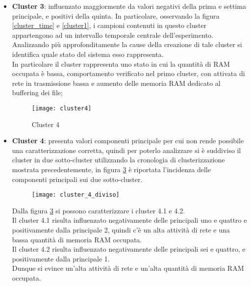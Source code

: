 \begin{itemize}
  \clearpage

  \begin{figure}[!htbp]
    \centering
    \texttt{[image: cluster3]}
    \caption{Cluster 3}
    \label{cluster3}
  \end{figure}

  \item \textbf{Cluster 3}: influenzato maggiormente da valori negativi della
  prima e settima principale, e positivi della quinta.
  In particolare, osservando la figura \ref{cluster_time} e \ref{cluster1}, i campioni contenuti
  in questo cluster appartengono ad un intervallo temporale centrale dell'esperimento.\\
  Analizzando più approfonditamente la cause della creazione di tale cluster si
  identifica quale stato del sistema esso rappresenta.\\
  In particolare il cluster rappresenta uno stato in cui la quantità di RAM occupata
  è bassa, comportamento verificato nel primo cluster, con attivata di rete in trasmissione
  bassa e aumento delle memoria RAM dedicato al buffering dei file;

  \clearpage

  \begin{figure}[!htbp]
    \centering
    \texttt{[image: cluster4]}
    \caption{Cluster 4}
    \label{cluster4}
  \end{figure}

  \item \textbf{Cluster 4}: presenta valori componenti principale per cui non
  rende possibile una caratterizzazione corretta, quindi per poterlo analizzare
  si è suddiviso il cluster in due sotto-cluster utilizzando la cronologia di
  clusterizzazione mostrata precedentemente, in figura \ref{cluster_4_diviso} è
  riportata l'incidenza delle componenti principali sui due sotto-cluster.\\

  \begin{figure}[!htbp]
    \centering
    \texttt{[image: cluster\_4\_diviso]}
    \caption{}
    \label{cluster_4_diviso}
  \end{figure}

  Dalla figura \ref{cluster_4_diviso} si possono caratterizzare i cluster 4.1 e 4.2.\\
  Il cluster 4.1 risulta influenzato  negativamente delle principali uno e quattro
  e positivamente dalla principale 2, quindi c'è un alta attività di rete
  e una bassa quantità di memoria RAM occupata.\\
  Il cluster 4.2 risulta influenzato negativamente delle principali sei e quattro,
  e positivamente dalla principale 1.\\
  Dunque si evince un'alta attività di rete e un'alta quantità di memoria RAM occupata.


\end{itemize}
